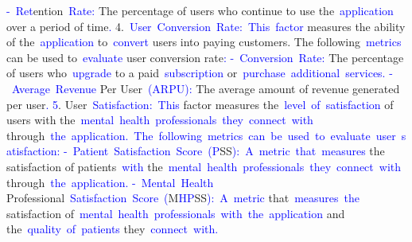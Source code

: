 \documentclass{article}
\begin{document}
\begin{tcolorbox}[colframe=black,colback=white]
{}\textcolor{blue}{-}\textcolor{blue}{~Ret}ention\textcolor{blue}{~Rate}\textcolor{blue}{:} The percentage of users who continue to use the\textcolor{blue}{~application} over a period of time\textcolor{blue}{.
}4.\textcolor{blue}{~User}\textcolor{blue}{~Conversion}\textcolor{blue}{~Rate}\textcolor{blue}{:}\textcolor{blue}{~This}\textcolor{blue}{~factor} measures the ability of the\textcolor{blue}{~application} to\textcolor{blue}{~convert} users into paying customers. The following\textcolor{blue}{~metrics} can be used to\textcolor{blue}{~evaluate} user conversion rate\textcolor{blue}{:
}\textcolor{blue}{-}\textcolor{blue}{~Conversion}\textcolor{blue}{~Rate}\textcolor{blue}{:} The percentage of users who\textcolor{blue}{~upgrade} to a paid\textcolor{blue}{~subscription} or\textcolor{blue}{~purchase}\textcolor{blue}{~additional}\textcolor{blue}{~services}\textcolor{blue}{.
}\textcolor{blue}{-}\textcolor{blue}{~Average}\textcolor{blue}{~Revenue} Per User\textcolor{blue}{~(}\textcolor{blue}{AR}\textcolor{blue}{PU}\textcolor{blue}{):} The average amount of revenue generated per user\textcolor{blue}{.
}\textcolor{blue}{5}. User\textcolor{blue}{~Satisfaction}\textcolor{blue}{:}\textcolor{blue}{~This} factor measures the\textcolor{blue}{~level}\textcolor{blue}{~of}\textcolor{blue}{~satisfaction} of users with the\textcolor{blue}{~mental}\textcolor{blue}{~health}\textcolor{blue}{~professionals}\textcolor{blue}{~they}\textcolor{blue}{~connect}\textcolor{blue}{~with} through\textcolor{blue}{~the}\textcolor{blue}{~application}\textcolor{blue}{.}\textcolor{blue}{~The}\textcolor{blue}{~following}\textcolor{blue}{~metrics}\textcolor{blue}{~can}\textcolor{blue}{~be}\textcolor{blue}{~used}\textcolor{blue}{~to}\textcolor{blue}{~evaluate}\textcolor{blue}{~user}\textcolor{blue}{~satisfaction}\textcolor{blue}{:
}\textcolor{blue}{-}\textcolor{blue}{~Patient}\textcolor{blue}{~Satisfaction}\textcolor{blue}{~Score}\textcolor{blue}{~(}\textcolor{blue}{P}SS\textcolor{blue}{):}\textcolor{blue}{~A}\textcolor{blue}{~metric}\textcolor{blue}{~that}\textcolor{blue}{~measures} the satisfaction of patients\textcolor{blue}{~with} the\textcolor{blue}{~mental}\textcolor{blue}{~health}\textcolor{blue}{~professionals}\textcolor{blue}{~they}\textcolor{blue}{~connect}\textcolor{blue}{~with} through\textcolor{blue}{~the}\textcolor{blue}{~application}\textcolor{blue}{.
}\textcolor{blue}{-}\textcolor{blue}{~Mental}\textcolor{blue}{~Health} Professional\textcolor{blue}{~Satisfaction}\textcolor{blue}{~Score}\textcolor{blue}{~(}M\textcolor{blue}{HP}SS\textcolor{blue}{):}\textcolor{blue}{~A}\textcolor{blue}{~metric} that\textcolor{blue}{~measures}\textcolor{blue}{~the} satisfaction of\textcolor{blue}{~mental}\textcolor{blue}{~health}\textcolor{blue}{~professionals}\textcolor{blue}{~with}\textcolor{blue}{~the}\textcolor{blue}{~application} and the\textcolor{blue}{~quality}\textcolor{blue}{~of}\textcolor{blue}{~patients} they\textcolor{blue}{~connect}\textcolor{blue}{~with}\textcolor{blue}{.
}
\end{tcolorbox}
\end{document}
